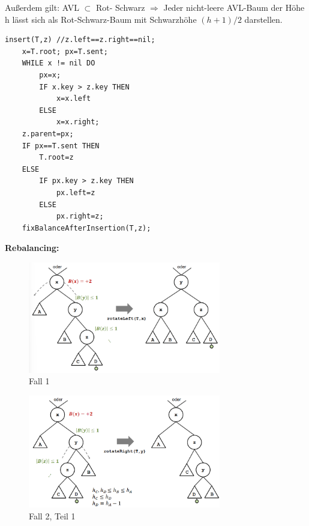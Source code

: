 \documentclass{article}
\begin{document}
            Außerdem gilt: AVL $\subset$ Rot- Schwarz $\Rightarrow$ Jeder nicht-leere AVL-Baum der Höhe h lässt sich als Rot-Schwarz-Baum mit Schwarzhöhe $(h+1)/2$ darstellen.\\
            \begin{lstlisting}[style=pseudocode]
insert(T,z) //z.left==z.right==nil;
    x=T.root; px=T.sent;
    WHILE x != nil DO
        px=x;
        IF x.key > z.key THEN
            x=x.left
        ELSE
            x=x.right;
    z.parent=px;
    IF px==T.sent THEN
        T.root=z
    ELSE
        IF px.key > z.key THEN
            px.left=z
        ELSE
            px.right=z;
    fixBalanceAfterInsertion(T,z);
            \end{lstlisting}
            \textbf{Rebalancing:}
            \begin{figure}[ht]
                \centering
                \includegraphics[width=0.75\textwidth]{Bilder/AVLRF1.png}
                \caption{Fall 1}
                \label{fig:AVLRF1}
            \end{figure}
            \begin{figure}[ht]
                \centering
                \includegraphics[width=0.75\textwidth]{Bilder/AVLRF2I.png}
                \caption{Fall 2, Teil 1}
                \label{fig:AVLRF2I}
            \end{figure}
\end{document}

